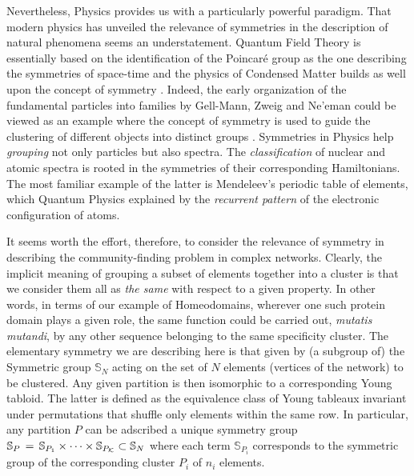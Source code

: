 \documentclass[twocolumn,aps,sort,nofootinbib]{revtex4}
\begin{document}
Nevertheless, Physics provides us with a particularly powerful paradigm.
That modern physics has unveiled the 
relevance of symmetries
in the description of natural phenomena seems an understatement.
Quantum Field Theory is essentially based on the identification
of the Poincar\'e group as the one describing the symmetries of
space-time \cite{Maggiore05} and the physics of Condensed Matter
builds as well upon the concept of symmetry \cite{Chaikin95,Gennes95}. 
Indeed, the early organization of the fundamental particles
into families by Gell-Mann, Zweig and Ne'eman \cite{WeinbergQFT}
could be viewed as an example where the concept
of symmetry is used to guide the clustering of different
objects into distinct groups \cite{Fuchs97}. Symmetries in Physics help
{\sl grouping} not only particles but also spectra. The {\sl classification} of nuclear
and atomic spectra is rooted in the symmetries of their corresponding
Hamiltonians. The most familiar example of the latter is 
Mendeleev's periodic table of elements, which Quantum Physics explained by
the {\sl recurrent pattern} of the electronic configuration of atoms\cite{Sakurai,Petrashen,Shalit}.

It seems worth the effort, therefore, to consider the relevance
of symmetry in describing the community-finding problem
in complex networks. Clearly, the implicit meaning of
grouping a subset of elements together into a cluster
is that we consider them all as {\em the same}
with respect to a given property. In other words,
in terms of our example of Homeodomains,  
wherever one such protein domain plays a given role,
the same function could be carried out, {\em mutatis mutandi},
by any other sequence belonging to the same specificity cluster.
The elementary symmetry we are describing here is
that given by (a subgroup of) the Symmetric group $\mathbb{S}_N$ acting on
the set of $N$ elements (vertices of the network) to be clustered.
Any given partition is then isomorphic to a corresponding
Young tabloid. The latter is defined as the equivalence
class of Young tableaux invariant under permutations
that shuffle only elements within the same row. In
particular, any partition $P$ can be adscribed a unique
symmetry group 
$\mathbb{S}_P\,=\,\mathbb{S}_{P_1}\times\dotsm\times \mathbb{S}_{P_{\cal K}}\subset \mathbb{S}_N$
where each term $\mathbb{S}_{P_i}$ corresponds to the symmetric group
of the corresponding cluster $P_i$ of $n_i$ elements. 
\end{document}
